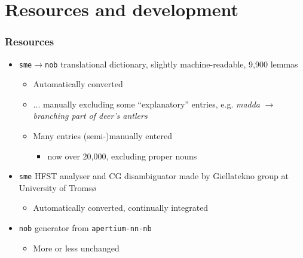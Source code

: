 \documentclass[notes=hide]{beamer}
\newcommand{\sme}{{\tt sme}}
\newcommand{\nob}{{\tt nob}}
\newcommand{\smenob}{\sme$\rightarrow{}$\nob}
\begin{document}
\section{Resources and development}
\begin{frame}
  \frametitle{Resources}
  \begin{itemize}
  \item \smenob{} translational dictionary, slightly machine-readable,
    9,900 lemmas
    \begin{itemize}
    \item Automatically converted
    \item ... manually excluding some
      ``explanatory'' entries, e.g. \textit{madda} $\rightarrow$
      \textit{branching part of deer's antlers}
    \item Many entries (semi-)manually entered
      \begin{itemize}
      \item now over 20,000, excluding proper nouns
      \end{itemize}

    \end{itemize}
  \end{itemize}
  \begin{itemize}
  \item \sme{} HFST analyser and CG disambiguator made by Giellatekno group
    at University of Tromsø
    \begin{itemize}
    \item Automatically converted, continually integrated
    \end{itemize}
  \end{itemize}
  \begin{itemize}
  \item \nob{} generator from \texttt{apertium-nn-nb}
    \begin{itemize}
    \item More or less unchanged
    \end{itemize}
  \end{itemize}
\end{frame}
\end{document}
